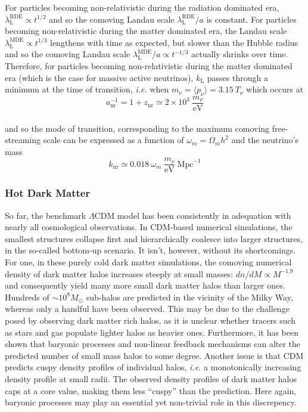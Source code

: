 For particles becoming non-relativistic during the radiation dominated era,
$\lambda^{\mathrm{RDE}}_{\mathrm{L}} \propto t^{1/2}$ and so the comoving Landau scale $\lambda^{\mathrm{RDE}}_{\mathrm{L}}/a$ is constant. For particles becoming non-relativistic during the matter dominated era, the Landau scale $\lambda^{\mathrm{MDE}}_{\mathrm{L}} \propto t^{1/3}$ lengthens with time as expected, but slower than the Hubble radius and so the comoving Landau scale $\lambda^{\mathrm{MDE}}_{\mathrm{L}}/a \propto t^{-1/3}$ actually shrinks over time. Therefore, for particles becoming non-relativistic during the matter dominated era (which is the case for massive active neutrinos), $k_{\mathrm{L}}$ passes through a minimum at the time of transition, \textit{i.e.} when $m_\nu = \langle p_\nu \rangle = 3.15~ T_\nu$ which occurs at \\
\begin{equation}
a_{\mathrm{nr}}^{-1} = 1+z_{\mathrm{nr}} \simeq 2 \times 10^3 ~ \frac{m_\nu}{\mathrm{eV}}
\end{equation} \\ and so the mode of transition, corresponding to the maximum comoving free-streaming scale can be expressed as a function of $\omega_m = \Omega_m h^2$ and the neutrino's mass \\
\begin{equation}
\label{eq:knr}
k_{\mathrm{nr}} \simeq 0.018 ~\omega_m ~\frac{ m_\nu}{\mathrm{eV}}~\mathrm{Mpc}^{-1}
\end{equation}



\subsubsection{Hot Dark Matter}
\label{sec:hdm}

So far, the benchmark $\Lambda$CDM model has been consistently in adequation with nearly all cosmological observations. In CDM-based numerical simulations, the smallest structures collapse first and hierarchically coalesce into larger structures, in the so-called bottom-up scenario. It isn't, however, without its shortcomings. For one, in these purely cold dark matter simulations, the comoving numerical density of dark matter halos increases steeply at small masses: $dn/dM \propto M^{-1.9}$ and consequently yield many more small dark matter halos than larger ones. Hundreds of $\sim 10^{8}M_{\odot}$ sub-halos are predicted in the vicinity of the Milky Way, whereas only a handful have been observed. This may be due to the challenge posed by observing dark matter rich halos, as it is unclear whether tracers such as stars and gas populate lighter halos as heavier ones. Furthermore, it has been shown that baryonic processes and non-linear feedback mechanisms can alter the predicted number of small mass halos to some degree. Another issue is that CDM predicts cuspy density profiles of individual halos, \textit{i.e.} a monotonically increasing density profile at small radii. The observed density profiles of dark matter halos caps at a core value, making them less ``cuspy'' than the prediction. Here again, baryonic processes may play an essential yet non-trivial role in this discrepency.\\

